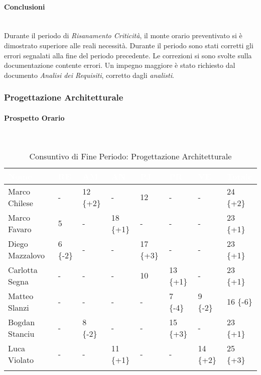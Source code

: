 \paragraph{Conclusioni} ~\\

Durante il periodo di \textit{Risanamento Criticità}, il monte orario preventivato si è dimostrato superiore alle reali necessità. Durante il periodo sono stati corretti gli errori segnalati alla fine del periodo precedente. Le correzioni si sono svolte sulla documentazione contente errori. Un impegno maggiore è stato richiesto dal documento \textit{Analisi dei Requisiti}, corretto dagli \textit{analisti}. \\

\newpage

\subsubsection{Progettazione Architetturale}
\label{pa}

\paragraph{Prospetto Orario} ~\\

\begin{longtable}{|C{.30\textwidth}|C{.06\textwidth}|C{.06\textwidth}|C{.06\textwidth} | C{.06\textwidth}| C{.06\textwidth} | C{.06\textwidth} | C{.10\textwidth} |}
\hline
{}	\textbf{\textcolor{white}{Nome}} & \textbf{\textcolor{white}{RE}} & \textbf{\textcolor{white}{AM}} & \textbf{\textcolor{white}{AN}} & \textbf{\textcolor{white}{PJ}} & \textbf{\textcolor{white}{PR}} & \textbf{\textcolor{white}{VE}} & \textbf{\textcolor{white}{Totale}}\\
\hline 
Marco Chilese & - & 12 \{+2\} & - & 12 & - & - & 24 \{+2\} \\
\hline
{}Marco Favaro & 5 & - & 18 \{+1\}  & - & - & - & 23 \{+1\} \\
\hline
Diego Mazzalovo & 6 \{-2\}& - & - & 17 \{+3\} & - & - & 23 \{+1\} \\ 
\hline
{}Carlotta Segna & - & - & - & 10 & 13 \{+1\} & - & 23 \{+1\} \\
\hline
Matteo Slanzi & - & - & - & - & 7 \{-4\} & 9 \{-2\} & 16 \{-6\} \\
\hline
{}Bogdan Stanciu & - & 8 \{-2\}& - & - & 15 \{+3\} & - & 23 \{+1\} \\
\hline
Luca Violato & - & - & 11 \{+1\} & - & - & 14 \{+2\} & 25 \{+3\} \\
\hline 

\caption{Consuntivo di Fine Periodo: Progettazione Architetturale}
\label{Distribuzione oraria del periodo di pa}
\end{longtable}


